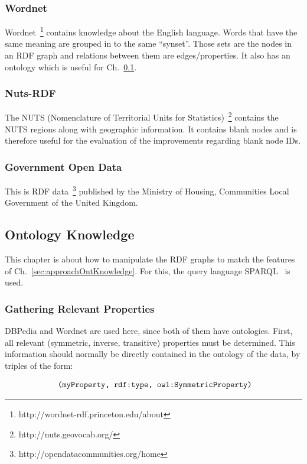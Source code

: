 \subsubsection{Wordnet}

Wordnet~\footnote{http://wordnet-rdf.princeton.edu/about} contains knowledge about the English language. Words that have the same meaning are grouped in to the same \enquote{synset}. Those sets are the nodes in an RDF graph and relations between them are edges/properties. It also has an ontology which is useful for Ch.~\ref{sec:implementationOntKnowledge}.

\subsubsection{Nuts-RDF}

The NUTS (Nomenclature of Territorial Units for Statistics)~\footnote{http://nuts.geovocab.org/} contains the NUTS regions along with geographic information. It contains blank nodes and is therefore useful for the evaluation of the improvements regarding blank node IDs.

\subsubsection{Government Open Data}

This is RDF data~\footnote{http://opendatacommunities.org/home} published by the Ministry of Housing, Communities Local Government of the United Kingdom.

\subsection{Ontology Knowledge}\label{sec:implementationOntKnowledge}

This chapter is about how to manipulate the RDF graphs to match the features of Ch.~\ref{sec:approachOntKnowledge}. For this, the query language SPARQL~\cite{sparql} is used.


\subsubsection{Gathering Relevant Properties}
DBPedia and Wordnet are used here, since both of them have ontologies. First, all relevant (symmetric, inverse, transitive) properties must be determined. This information should normally be directly contained in the ontology of the data, by triples of the form:

\[
\text{ {\tt (myProperty, rdf:type, owl:SymmetricProperty)}}
\] 


